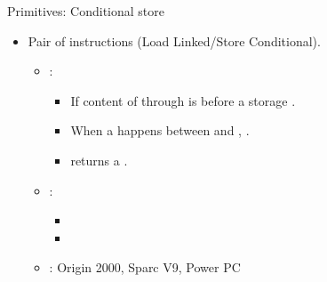 \begin{frame}[t]{Primitives: Conditional store}
\begin{itemize}
  \item Pair of instructions  (Load Linked/Store Conditional).
    \begin{itemize}

      \item {}:
        \begin{itemize}
          \item If content of  through  
                is  before a  storage .
          \item When a  happens between  and , 
                 .
          \item {} returns a .
        \end{itemize}

      \item {}:
        \begin{itemize}
          \item {}
          \item {}
        \end{itemize}

      \item {}: Origin 2000, Sparc V9, Power PC
    \end{itemize}
\end{itemize}
\end{frame}
